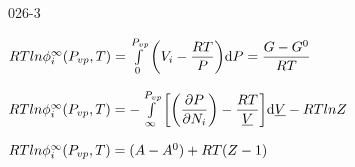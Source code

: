 \begin{mitframe}{026-3}

 	
    \begin{listone}
 
    	\item 
        $\gasconst\Temp{ln}\eleccoeff_{\state}^{\infty}(\p_{vp},\Temp)=\int\limits_0^{\p_{vp}}\bigg(\vol_{\state}-\dfrac{\gasconst\Temp}{\p}\bigg)\mathrm{d}\p=\dfrac{\gibbs-\gibbs^0}{\gasconst\Temp}$
        
        \item$\gasconst\Temp{ln}\eleccoeff_{\state}^{\infty}(\p_{vp},\Temp)=-\int\limits_{\infty}^{\p_{vp}}\bigg[\bigg(\dfrac{\partial\p}{\partial\nummoles_{\state}}\bigg)-\dfrac{\gasconst\Temp}{\uline\vol}\bigg]\mathrm{d}\uline\vol-\gasconst\Temp{ln}\compress$
        
        \item   $\gasconst\Temp{ln}\eleccoeff_{\state}^{\infty}(\p_{vp},\Temp)=(\helmholtz-\helmholtz^0)+\gasconst\Temp(\compress-1)$       
	\end{listone}        
        
\end{mitframe}
